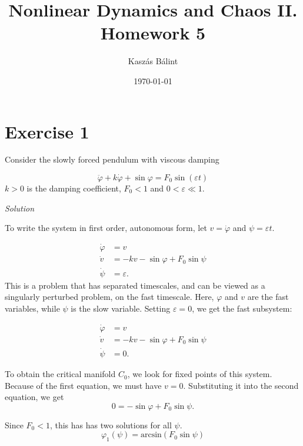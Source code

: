 \documentclass[a4paper,11pt,pdftex]{article}
\title{Nonlinear Dynamics and Chaos II. \\ Homework 5}
\author{Kaszás Bálint}
\date{\today}
\begin{document}
\pagestyle{fancy}

\maketitle


\section*{Exercise 1}
Consider the slowly forced pendulum with viscous damping

\begin{equation*}
    \label{eq1}\ddot{\varphi} + k\dot{\varphi} + \sin \varphi = F_0 \sin (\varepsilon t)
\end{equation*}
$k>0$ is the damping coefficient, $F_0<1$ and $0<\varepsilon \ll 1$. 

\emph{Solution}

To write the system in first order, autonomous form, let $v = \dot{\varphi}$ and $\psi = \varepsilon t$. 

\begin{align*}
    \dot{\varphi} & = v \\
    \dot{v} & = -k v - \sin \varphi + F_0 \sin \psi \\
    \dot{\psi} &= \varepsilon.
\end{align*}
This is a problem that has separated timescales, and can be viewed as a singularly perturbed problem, on the fast timescale. Here, $\varphi$ and $v$ are the fast variables, while $\psi$ is the slow variable. Setting $\varepsilon = 0$, we get the fast subsystem:

\begin{align*}
    \dot{\varphi} & = v \\
    \dot{v} & = -k v - \sin \varphi + F_0 \sin \psi \\
    \dot{\psi} &= 0.
\end{align*}

To obtain the critical manifold $C_0$, we look for fixed points of this system. Because of the first equation, we must have $v=0$. Substituting it into the second equation, we get
\begin{equation*}
    0 = -\sin \varphi + F_0 \sin \psi.
\end{equation*}

Since $F_0<1$, this has has two solutions for all $\psi$. 
\begin{equation}
\label{root1}
    \varphi_1(\psi) = \text{arcsin}(F_0 \sin \psi)
\end{equation}
\end{document}
